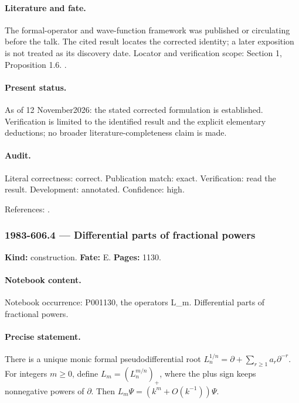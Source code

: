 \paragraph{Literature and fate.} The formal-operator and wave-function framework was published or circulating before the talk. The cited result locates the corrected identity; a later exposition is not treated as its discovery date. Locator and verification scope: Section 1, Proposition 1.6. \cite{cherednik1978differential}.

\paragraph{Present status.} As of 12 November2026: the stated corrected formulation is established. Verification is limited to the identified result and the explicit elementary deductions; no broader literature-completeness claim is made.

\paragraph{Audit.} Literal correctness: correct. Publication match: exact. Verification: read the result. Development: annotated. Confidence: high.

\noindent References: \citep{cherednik1978differential}.\par

\subsubsection{1983-606.4 --- Differential parts of fractional powers}

\label{item:1983-606.4}

\noindent\textbf{Kind:} construction. \textbf{Fate:} E. \textbf{Pages:} 1130.\par

\paragraph{Notebook content.} Notebook occurrence: P001130, the operators L_m. Differential parts of fractional powers.

\paragraph{Precise statement.} There is a unique monic formal pseudodifferential root \(L_n^{1/n}=\partial+\sum_{r\ge1}a_r\partial^{-r}\). For integers \(m\ge0\), define \(L_m=(L_n^{m/n})_+\), where the plus sign keeps nonnegative powers of \(\partial\). Then \(L_m\Psi=(k^m+O(k^{-1}))\Psi\).

